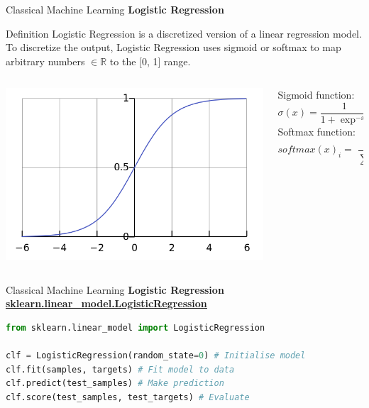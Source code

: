 \documentclass{beamer}
\begin{document}
\begin{frame}[fragile]{Classical Machine Learning}
    \textbf{Logistic Regression}
    \begin{block}{Definition}
        Logistic Regression is a discretized version of a linear regression model. To discretize the output, Logistic Regression uses sigmoid or softmax to map arbitrary numbers $\in \mathbb{R}$ to the [0, 1] range.
        \begin{columns}[T]
            \begin{column}{.40\textwidth}
                \begin{center}
                    \includegraphics[width=.80\textwidth,height=\textheight,keepaspectratio]{figures/Logistic-Sigmoid.png}
                \end{center}
            \end{column}%
            \hfill%
            \begin{column}{.40\textwidth}
                Sigmoid function:
                \begin{equation*}
                    \sigma(x) = \frac{1}{1 + \exp^{-x}}
                \end{equation*}
                Softmax function:
                \begin{equation*}
                    softmax(x)_{i} = \frac{\exp^{x_{i}}}{\sum_{j=1}^{K}\exp^{x_{j}}}
                \end{equation*}
            \end{column}%
        \end{columns}
    \end{block}
\end{frame}
\begin{frame}[fragile]{Classical Machine Learning}
    \textbf{Logistic Regression}
    \href{https://scikit-learn.org/stable/modules/generated/sklearn.linear_model.LogisticRegression.html}{\textbf{\underline{sklearn.linear\_model.LogisticRegression}}}
    \begin{example}
        \begin{lstlisting}[language=Python]
from sklearn.linear_model import LogisticRegression

clf = LogisticRegression(random_state=0) # Initialise model
clf.fit(samples, targets) # Fit model to data
clf.predict(test_samples) # Make prediction
clf.score(test_samples, test_targets) # Evaluate
        \end{lstlisting}
    \end{example}
\end{frame}
\end{document}
